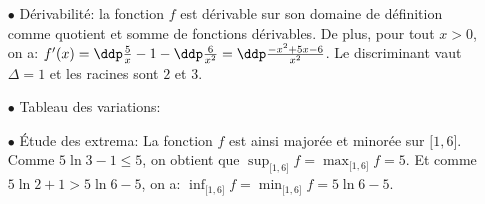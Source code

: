 \begin{correction}
\begin{enumerate}
\begin{itemize}
\item[$\bullet$] D\'erivabilit\'e: la fonction $f$ est d\'erivable sur son domaine de d\'efinition comme quotient et somme de fonctions d\'erivables. De plus, pour tout $x>0$, on a: $f^{\prime}(x)=\ddp\frac{5}{x}-1-\ddp\frac{6}{x^2}=\ddp\frac{-x^2+5x-6}{x^2}$. Le discriminant vaut $\Delta=1$ et les racines sont $2$ et $3$.  
\item[$\bullet$] Tableau des variations:
\begin{center}
\end{center}
\item[$\bullet$] \'Etude des extrema: La fonction $f$ est ainsi major\'ee et minor\'ee sur $\lbrack 1,6\rbrack$. Comme $5\ln{3}-1\leq 5$, on obtient que $\sup_{\lbrack 1,6\rbrack } f=\max_{\lbrack 1,6\rbrack} f=5$. Et comme $5\ln{2}+1>5\ln{6}-5$, on a: $\inf_{\lbrack 1,6\rbrack } f=\min_{\lbrack 1,6\rbrack} f=5\ln{6}-5$.
\end{itemize}
\end{enumerate}
\end{correction}